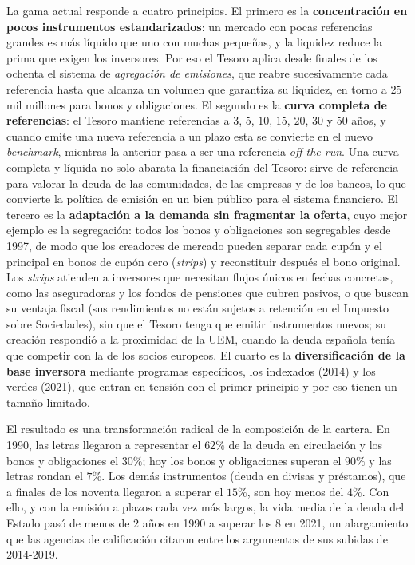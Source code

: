 \documentclass[10pt,a4paper]{article}
\begin{document}
La gama actual responde a cuatro principios. El primero es la \textbf{concentración en pocos instrumentos estandarizados}: un mercado con pocas referencias grandes es más líquido que uno con muchas pequeñas, y la liquidez reduce la prima que exigen los inversores. Por eso el Tesoro aplica desde finales de los ochenta el sistema de \textit{agregación de emisiones}, que reabre sucesivamente cada referencia hasta que alcanza un volumen que garantiza su liquidez, en torno a $25$ mil millones para bonos y obligaciones. El segundo es la \textbf{curva completa de referencias}: el Tesoro mantiene referencias a $3$, $5$, $10$, $15$, $20$, $30$ y $50$ años, y cuando emite una nueva referencia a un plazo esta se convierte en el nuevo \textit{benchmark}, mientras la anterior pasa a ser una referencia \textit{off-the-run}. Una curva completa y líquida no solo abarata la financiación del Tesoro: sirve de referencia para valorar la deuda de las comunidades, de las empresas y de los bancos, lo que convierte la política de emisión en un bien público para el sistema financiero. El tercero es la \textbf{adaptación a la demanda sin fragmentar la oferta}, cuyo mejor ejemplo es la segregación: todos los bonos y obligaciones son segregables desde 1997, de modo que los creadores de mercado pueden separar cada cupón y el principal en bonos de cupón cero (\textit{strips}) y reconstituir después el bono original. Los \textit{strips} atienden a inversores que necesitan flujos únicos en fechas concretas, como las aseguradoras y los fondos de pensiones que cubren pasivos, o que buscan su ventaja fiscal (sus rendimientos no están sujetos a retención en el Impuesto sobre Sociedades), sin que el Tesoro tenga que emitir instrumentos nuevos; su creación respondió a la proximidad de la UEM, cuando la deuda española tenía que competir con la de los socios europeos. El cuarto es la \textbf{diversificación de la base inversora} mediante programas específicos, los indexados (2014) y los verdes (2021), que entran en tensión con el primer principio y por eso tienen un tamaño limitado.

El resultado es una transformación radical de la composición de la cartera. En 1990, las letras llegaron a representar el $62\%$ de la deuda en circulación y los bonos y obligaciones el $30\%$; hoy los bonos y obligaciones superan el $90\%$ y las letras rondan el $7\%$. Los demás instrumentos (deuda en divisas y préstamos), que a finales de los noventa llegaron a superar el $15\%$, son hoy menos del $4\%$. Con ello, y con la emisión a plazos cada vez más largos, la vida media de la deuda del Estado pasó de menos de $2$ años en 1990 a superar los $8$ en 2021, un alargamiento que las agencias de calificación citaron entre los argumentos de sus subidas de 2014-2019.
\end{document}
